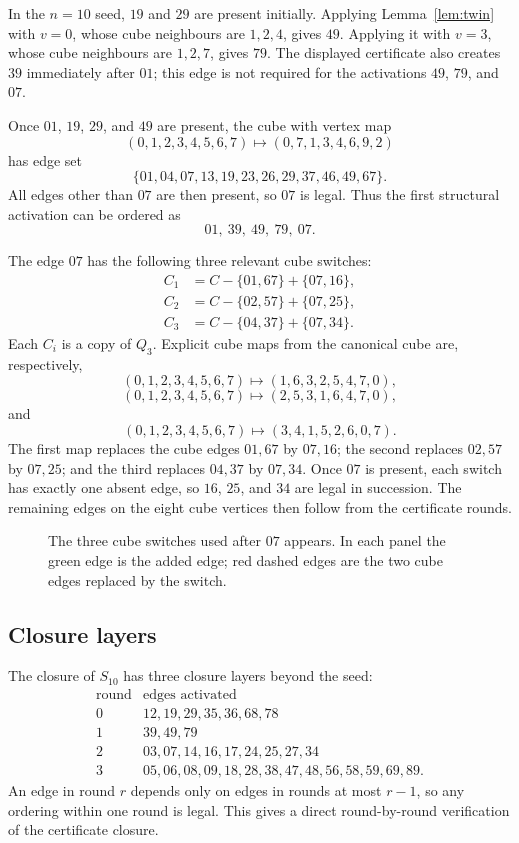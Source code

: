 \documentclass[11pt]{article}
\numberwithin{equation}{section}
\begin{document}
In the $n=10$ seed, $19$ and $29$ are present initially. Applying Lemma~\ref{lem:twin} with $v=0$, whose cube neighbours are $1,2,4$, gives $49$. Applying it with $v=3$, whose cube neighbours are $1,2,7$, gives $79$. The displayed certificate also creates $39$ immediately after $01$; this edge is not required for the activations $49$, $79$, and $07$.

Once $01$, $19$, $29$, and $49$ are present, the cube with vertex map
\[
(0,1,2,3,4,5,6,7)\longmapsto(0,7,1,3,4,6,9,2)
\]
has edge set
\[
\{01,04,07,13,19,23,26,29,37,46,49,67\}.
\]
All edges other than $07$ are then present, so $07$ is legal. Thus the first structural activation can be ordered as
\[
01,\ 39,\ 49,\ 79,\ 07.
\]

The edge $07$ has the following three relevant cube switches:
\[
\begin{aligned}
C_1&=C-\{01,67\}+\{07,16\},\\
C_2&=C-\{02,57\}+\{07,25\},\\
C_3&=C-\{04,37\}+\{07,34\}.
\end{aligned}
\tag{5.3}
\]
Each $C_i$ is a copy of $Q_3$. Explicit cube maps from the canonical cube are, respectively,
\[
(0,1,2,3,4,5,6,7)\mapsto(1,6,3,2,5,4,7,0),
\]
\[
(0,1,2,3,4,5,6,7)\mapsto(2,5,3,1,6,4,7,0),
\]
and
\[
(0,1,2,3,4,5,6,7)\mapsto(3,4,1,5,2,6,0,7).
\]
The first map replaces the cube edges $01,67$ by $07,16$; the second replaces $02,57$ by $07,25$; and the third replaces $04,37$ by $07,34$. Once $07$ is present, each switch has exactly one absent edge, so $16$, $25$, and $34$ are legal in succession. The remaining edges on the eight cube vertices then follow from the certificate rounds.

\begin{figure}[t]
\centering
\resizebox{0.96\linewidth}{!}{}
\caption{The three cube switches used after $07$ appears. In each panel the green edge is the added edge; red dashed edges are the two cube edges replaced by the switch.}
\label{fig:switches}
\end{figure}

\subsection{Closure layers}
The closure of $S_{10}$ has three closure layers beyond the seed:
\[
\begin{array}{c|l}
\text{round}&\text{edges activated}\\ \hline
0&12,19,29,35,36,68,78\\
1&39,49,79\\
2&03,07,14,16,17,24,25,27,34\\
3&05,06,08,09,18,28,38,47,48,56,58,59,69,89.
\end{array}
\tag{5.4}
\]
An edge in round $r$ depends only on edges in rounds at most $r-1$, so any ordering within one round is legal. This gives a direct round-by-round verification of the certificate closure.
\end{document}
